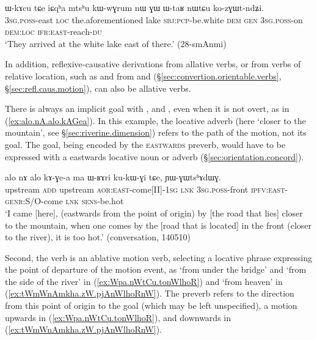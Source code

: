 \begin{exe}
	\ex \label{ex:WkAcu.kozGWtndZi}
	\gll ɯ-kɤcu tɕe iɕqʰa mtsʰu kɯ-wɣrum nɯ ɣɯ ɯ-taʁ nɯtɕu ko-zɣɯt-ndʑi. \\ 
	\textsc{3sg}.\textsc{poss}-east \textsc{loc} the.aforementioned lake \textsc{sbj}:\textsc{pcp}-be.white \textsc{dem} \textsc{gen} \textsc{3sg}.\textsc{poss}-on \textsc{dem}:\textsc{loc} \textsc{ifr}:\textsc{east}-reach-\textsc{du} \\
	\glt `They arrived at the white lake east of there.' (28-smAnmi)
\end{exe}


In addition, reflexive-causative derivations from allative verbs, or from verbs of relative location, such as  and  from  and  (§\ref{sec:convertion.orientable.verbs}, §\ref{sec:refl.caus.motion}), can also be allative verbs.

There is always an implicit goal with ,  and , even when it is not overt, as in (\ref{ex:alo.nA.alo.kAGea}). In this example, the locative adverb  (here `closer to the mountain', see §\ref{sec:riverine.dimension}) refers to the path of the motion, not its goal. The goal, being encoded by the \textsc{eastwards} preverb, would have to be expressed with a eastwards locative noun or adverb (§\ref{sec:orientation.concord}).

\begin{exe}
\ex \label{ex:alo.nA.alo.kAGea}
\gll alo nɤ alo kɤ-ɣe-a ma ɯ-ʁɤri ku-kɯ-ɣi tɕe, ɲɯ-ɣɯtsʰɤdɯɣ. \\
upstream \textsc{add} upstream \textsc{aor}:\textsc{east}-come[II]-\textsc{1sg} \textsc{lnk} \textsc{3sg}.\textsc{poss}-front \textsc{ipfv}:\textsc{east}-\textsc{genr}:S/O-come \textsc{lnk} \textsc{sens}-be.hot \\
\glt `I came [here], (eastwards from the point of origin) by [the road that lies] closer to the mountain, when one comes by the [road that is located] in the front (closer to the river), it is too hot.' (conversation, 140510)
\end{exe}

Second, the verb  is an ablative motion verb, selecting a locative phrase expressing the point of departure of the motion event, as  `from under the bridge' and  `from the side of the river' in (\ref{ex:Wpa.nWtCu.tonWlhoR}) and  `from heaven' in (\ref{ex:tWmWnAmkha.zW.pjAnWlhoRnW}). The preverb refers to the direction from this point of origin to the goal (which may be left unspecified), a motion upwards in (\ref{ex:Wpa.nWtCu.tonWlhoR}), and downwards in (\ref{ex:tWmWnAmkha.zW.pjAnWlhoRnW}).

